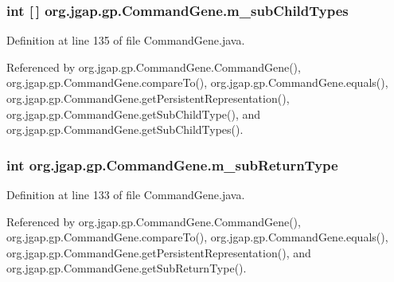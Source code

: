 \hypertarget{classorg_1_1jgap_1_1gp_1_1_command_gene_a0048389afa8d081b56e5b00d1eee343e}{
\subsubsection[{m\-\_\-sub\-Child\-Types}]{\setlength{\rightskip}{0pt plus 5cm}int \mbox{[}$\,$\mbox{]} org.\-jgap.\-gp.\-Command\-Gene.\-m\-\_\-sub\-Child\-Types\hspace{0.3cm}{\ttfamily [private]}}}\label{classorg_1_1jgap_1_1gp_1_1_command_gene_a0048389afa8d081b56e5b00d1eee343e}


Definition at line 135 of file Command\-Gene.\-java.



Referenced by org.\-jgap.\-gp.\-Command\-Gene.\-Command\-Gene(), org.\-jgap.\-gp.\-Command\-Gene.\-compare\-To(), org.\-jgap.\-gp.\-Command\-Gene.\-equals(), org.\-jgap.\-gp.\-Command\-Gene.\-get\-Persistent\-Representation(), org.\-jgap.\-gp.\-Command\-Gene.\-get\-Sub\-Child\-Type(), and org.\-jgap.\-gp.\-Command\-Gene.\-get\-Sub\-Child\-Types().

\hypertarget{classorg_1_1jgap_1_1gp_1_1_command_gene_a8fb8742b3f1740df8a71bf96619b5372}{
\subsubsection[{m\-\_\-sub\-Return\-Type}]{\setlength{\rightskip}{0pt plus 5cm}int org.\-jgap.\-gp.\-Command\-Gene.\-m\-\_\-sub\-Return\-Type\hspace{0.3cm}{\ttfamily [private]}}}\label{classorg_1_1jgap_1_1gp_1_1_command_gene_a8fb8742b3f1740df8a71bf96619b5372}


Definition at line 133 of file Command\-Gene.\-java.



Referenced by org.\-jgap.\-gp.\-Command\-Gene.\-Command\-Gene(), org.\-jgap.\-gp.\-Command\-Gene.\-compare\-To(), org.\-jgap.\-gp.\-Command\-Gene.\-equals(), org.\-jgap.\-gp.\-Command\-Gene.\-get\-Persistent\-Representation(), and org.\-jgap.\-gp.\-Command\-Gene.\-get\-Sub\-Return\-Type().

